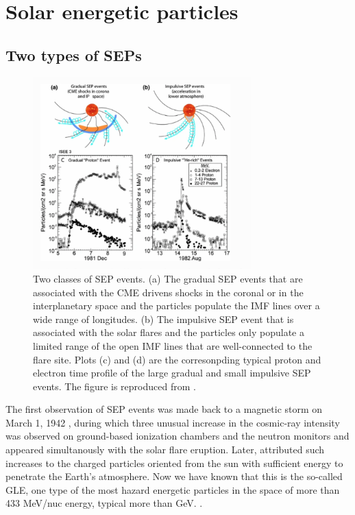 \section{Solar energetic particles}

\subsection{Two types of SEPs}

\begin{figure}[!htb]
	\centering
	\includegraphics[width = 0.75\textwidth]{images/SEP_two_type.png}
	\caption[Two types of Solar energetic particle (SEP) event]{Two classes of \ac{SEP} events. (a) The gradual \ac{SEP} events that are associated with the CME drivens shocks in the coronal or in the interplanetary space and the particles populate the \ac{IMF} lines over a wide range of longitudes. (b) The impulsive SEP event that is associated with the solar flares and the particles only populate a limited range of the open \ac{IMF} lines that are well-connected to the flare site. Plots (c) and (d) are the corresonpding typical proton and electron time profile of the large gradual and small impulsive SEP events. The figure is reproduced from \citet{Desai_Diacalone2016LRSP}.}
	\label{Fig:two_type_SEP}
\end{figure}
The first observation of \ac{SEP} events was made back to a magnetic storm on March 1, 1942 \citep{lange1942note,forbush1942further}, during which three unusual increase in the cosmic-ray intensity was observed on ground-based ionization chambers and the neutron monitors and appeared simultanously with the solar flare eruption. Later, \citet{Forbush1946} attributed such increases to the charged particles oriented from the sun with sufficient energy to penetrate the Earth's atmosphere. Now we have known that this is the so-called \ac{GLE}, one type of the most hazard energetic particles in the space of more than 433 MeV/nuc energy, typical more than GeV. \citep{meyer1956solar,Shea2012SSRv,gopalswamy2013first,thakur2014ground, Reames2013, Mironshnichenko2013Ge}.

